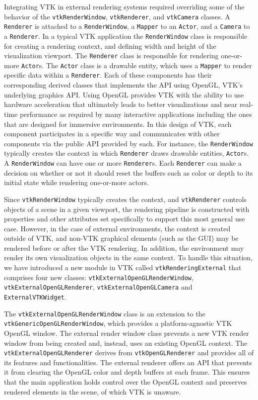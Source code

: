 Integrating VTK in external rendering systems required overriding some of the behavior of the \texttt{vtkRenderWindow}, \texttt{vtkRenderer}, and \texttt{vtkCamera} classes. A \texttt{Renderer} is attached to a \texttt{RenderWindow}, a \texttt{Mapper} to an \texttt{Actor}, and a \texttt{Camera} to a \texttt{Renderer}. In a typical VTK application the \texttt{RenderWindow} class is responsible for creating a rendering context, and defining width and height of the visualization viewport. The \texttt{Renderer} class is responsible for rendering one-or-more \texttt{Actor}s. The \texttt{Actor} class is a drawable entity, which uses a \texttt{Mapper} to render specific data within a \texttt{Renderer}. Each of these components has their corresponding derived classes that implements the API using OpenGL, VTK's underlying graphics API. Using OpenGL provides VTK with the ability to use hardware acceleration that ultimately leads to better visualizations and near real-time performance as required by many interactive applications including the ones that are designed for immersive environments. In this design of VTK, each component participates in a specific way and communicates with other components via the public API provided by each. For instance, the \texttt{RenderWindow} typically creates the context in which \texttt{Renderer} draws drawable entities, \texttt{Actor}s. A \texttt{RenderWindow} can have one or more \texttt{Renderer}s. Each \texttt{Renderer} can make a decision on whether or not it should reset the buffers such as color or depth to its initial state while rendering one-or-more actors. 

Since \texttt{vtkRenderWindow} typically creates the context, and \texttt{vtkRenderer} controls objects of a scene in a given viewport, the rendering pipeline is constructed with properties and other attributes set specifically to support this most general use case. However, in the case of external environments, the context is created outside of VTK, and non-VTK graphical elements (such as the GUI) may be rendered before or after the VTK rendering. In addition, the environment may render its own visualization objects in the same context. To handle this situation, we have introduced a new module in VTK called \texttt{vtkRenderingExternal} that comprises four new classes: \texttt{vtkExternalOpenGLRenderWindow}, \texttt{vtkExternalOpenGLRenderer}, \texttt{vtkExternalOpenGLCamera} and \texttt{ExternalVTKWidget}.

The \texttt{vtkExternalOpenGLRenderWindow} class is an extension to the \texttt{vtkGenericOpenGLRenderWindow}, which provides a platform-agnostic VTK OpenGL window. The external render window class prevents a new VTK render window from being created and, instead, uses an existing OpenGL context. The \texttt{vtkExternalOpenGLRenderer} derives from \texttt{vtkOpenGLRenderer} and provides all of its features and functionalities. The external renderer offers an API that prevents it from clearing the OpenGL color and depth buffers at each frame. This ensures that the main application holds control over the OpenGL context and preserves rendered elements in the scene, of which VTK is unaware.

